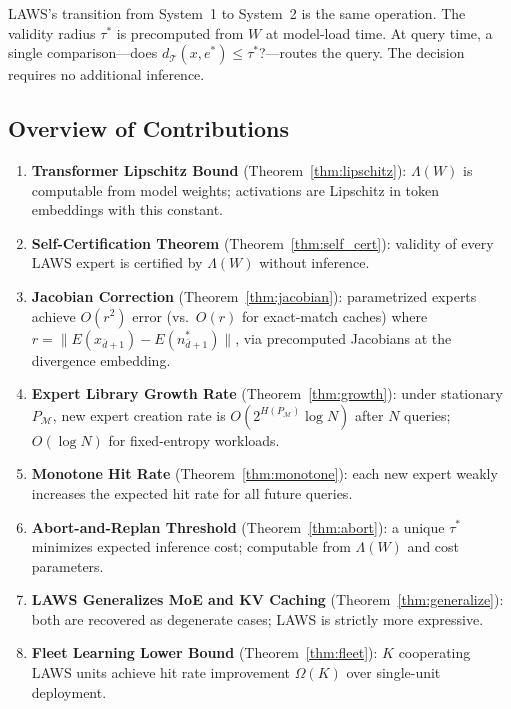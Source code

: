 \documentclass[11pt]{article}
\begin{document}
LAWS's transition from System~1 to System~2 is the same operation.  The validity
radius $\tau^*$ is precomputed from $W$ at model-load time.  At query time, a
single comparison---does $d_{\mathcal{T}}(x, e^*) \leq \tau^*$?---routes the
query.  The decision requires no additional inference.

\subsection{Overview of Contributions}

\begin{enumerate}[leftmargin=2em]
  \item \textbf{Transformer Lipschitz Bound} (Theorem~\ref{thm:lipschitz}):
        $\Lambda(W)$ is computable from model weights; activations are
        Lipschitz in token embeddings with this constant.

  \item \textbf{Self-Certification Theorem} (Theorem~\ref{thm:self_cert}):
        validity of every LAWS expert is certified by $\Lambda(W)$ without
        inference.

  \item \textbf{Jacobian Correction} (Theorem~\ref{thm:jacobian}):
        parametrized experts achieve $O(r^2)$ error (vs.\
        $O(r)$ for exact-match caches) where $r = \|E(x_{\bar{d}+1})-E(n^*_{\bar{d}+1})\|$,
        via precomputed Jacobians at the divergence embedding.
  \item \textbf{Expert Library Growth Rate} (Theorem~\ref{thm:growth}):
        under stationary $P_{\mathcal{M}}$, new expert creation rate is
        $O(2^{H(P_{\mathcal{M}})} \log N)$ after $N$ queries; $O(\log N)$
        for fixed-entropy workloads.

  \item \textbf{Monotone Hit Rate} (Theorem~\ref{thm:monotone}):
        each new expert weakly increases the expected hit rate for all future
        queries.

  \item \textbf{Abort-and-Replan Threshold} (Theorem~\ref{thm:abort}):
        a unique $\tau^*$ minimizes expected inference cost; computable from
        $\Lambda(W)$ and cost parameters.

  \item \textbf{LAWS Generalizes MoE and KV Caching} (Theorem~\ref{thm:generalize}):
        both are recovered as degenerate cases; LAWS is strictly more expressive.

  \item \textbf{Fleet Learning Lower Bound} (Theorem~\ref{thm:fleet}):
        $K$ cooperating LAWS units achieve hit rate improvement
        $\Omega(K)$ over single-unit deployment.


\end{enumerate}
\end{document}
